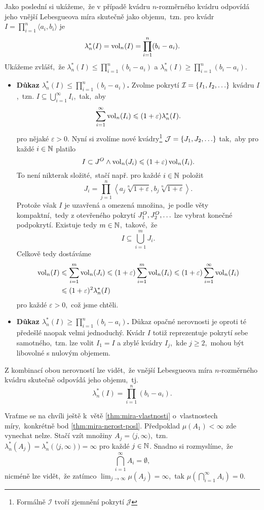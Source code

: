 \begin{example}\label{ex:lebegueova-mira-objem-kvadru}
    Jako poslední si ukážeme,~že v případě kvádru $n$-rozměrného kvádru odpovídá jeho vnější Lebesgueova míra skutečně jako objemu,~tzn. pro kvádr $I=\prod_{i=1}^{n}\langle a_i,b_i\rangle$ je
    \[\lambda_n^*(I)=\operatorname{vol}_n(I)=\prod_{i=1}^{n}(b_i-a_i).\]
    Ukážeme zvlášť,~že $\lambda_n^*(I)\leqslant \prod_{i=1}^{n}(b_i-a_i)$ a $\lambda_n^*(I)\geqslant\prod_{i=1}^{n}(b_i-a_i)$.
    \begin{itemize}
        \item \textbf{Důkaz $\lambda_n^*(I)\leqslant \prod_{i=1}^{n}(b_i-a_i)$.} Zvolme pokrytí $\mathcal{I}=\left\{I_1,I_2,\ldots\right\}$ kvádru $I$,~tzn. $I\subseteq\bigcup_{i=1}^\infty I_i$,~tak,~aby
        \[\sum_{i=1}^{\infty}\operatorname{vol}_n(I_i)\leqslant(1+\varepsilon)\lambda_n^*(I).\]
        pro nějaké $\varepsilon>0$. Nyní si zvolíme nové kvádry\footnote{Formálně $\mathcal{I}$ tvoří zjemnění pokrytí $\mathcal{J}$} $\mathcal{J}=\left\{J_1,J_2,\ldots\right\}$ tak,~aby pro každé $i\in\mathbb{N}$ platilo
        \[I\subset J^O\land\operatorname{vol}_n(J_i)\leqslant(1+\varepsilon)\operatorname{vol}_n(I_i).\]
        To není nikterak složité,~stačí např. pro každé $i\in\mathbb{N}$ položit
        \[J_i=\prod_{j=1}^{n}\left\langle a_j\sqrt[n]{1+\varepsilon},b_j\sqrt[n]{1+\varepsilon}\right\rangle.\]
        Protože však $I$ je uzavřená a omezená množina,~je podle věty  kompaktní,~tedy z otevřeného pokrytí $J_1^O,J_2^O,\ldots$ lze vybrat konečné podpokrytí. Existuje tedy $m\in\mathbb{N}$,~takové,~že
        \[I\subseteq\bigcup_{i=1}^m J_i.\]
        Celkově tedy dostáváme
        \begin{align*}
            \operatorname{vol}_n(I)&\leqslant\sum_{i=1}^{m}\operatorname{vol}_n(J_i)\leqslant(1+\varepsilon)\sum_{i=1}^{m}\operatorname{vol}_n(I_i)\leqslant(1+\varepsilon)\sum_{i=1}^{\infty}\operatorname{vol}_n(I_i)\\
            &\leqslant (1+\varepsilon)^2\lambda_n^*(I)
        \end{align*}
        pro každé $\varepsilon>0$,~což jsme chtěli.
        \item \textbf{Důkaz $\lambda_n^*(I)\geqslant \prod_{i=1}^{n}(b_i-a_i)$.} Důkaz opačné nerovnosti je oproti té předešlé naopak velmi jednoduchý. Kvádr $I$ totiž reprezentuje pokrytí sebe samotného,~tzn. lze volit $I_1=I$ a zbylé kvádry $I_j$,~kde $j\geqslant 2$,~mohou být libovolné s nulovým objemem.
    \end{itemize}
    Z kombinací obou nerovností lze vidět,~že vnější Lebesgueova míra $n$-rozměrného kvádru skutečně odpovídá jeho objemu,~tj.
    \[\lambda_n^*(I)=\prod_{i=1}^{n}(b_i-a_i).\]
\end{example}
\begin{remark}
    Vraťme se na chvíli ještě k~větě \ref{thm:mira-vlastnosti} o~vlastnostech míry,~konkrétně bod \ref{thm:mira-nerost-posl}. Předpoklad $\mu(A_1)<\infty$ zde vynechat nelze. Stačí vzít množiny $A_j=\langle j,\infty)$,~tzn. $\lambda_n^*(A_j)=\lambda_n^*(\langle j,\infty))=\infty$ pro každé $j\in\mathbb{N}$. Snadno si rozmyslíme,~že
    \[\bigcap_{i=1}^\infty A_i=\emptyset,\]
    nicméně lze vidět,~že zatímco $\lim_{j\to\infty}\mu(A_j)=\infty$,~tak $\mu\left(\bigcap_{i=1}^\infty A_i\right)=0$.
\end{remark}

